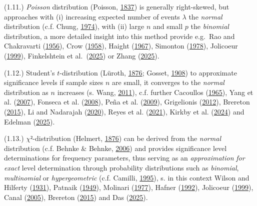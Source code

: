 \documentclass[
]{article}
\begin{document}
(1.11.) \emph{Poisson} distribution (Poisson,
\href{https://gallica.bnf.fr/ark:/12148/bpt6k110193z/f218.image}{1837})
is generally right-skewed, but approaches with (i) increasing expected
number of events \(\lambda\) the \emph{normal} distribution (c.f. Chung,
\href{https://doi.org/10.1007/978-1-4757-3973-2_7}{1974}), with (ii)
large \(n\) and small \(p\) the \emph{binomial} distribution, a more
detailed insight into this method provide e.g.~Rao and Chakravarti
(\href{http://www.jstor.org/stable/3001466}{1956}), Crow
(\href{http://www.jstor.org/stable/2333201}{1958}), Haight
(\href{https://books.google.com/books?id=l8Y-AAAAIAAJ}{1967}), Simonton
(\href{http://www.jstor.org/stable/284821}{1978}), Jolicoeur
(\href{https://doi.org/10.1007/978-1-4615-4777-8_19}{1999}),
Finkelshtein et
al.~(\href{https://doi.org/10.1007/s11009-025-10171-9}{2025}) or Zhang
(\href{https://doi.org/10.54254/2754-1169/2025.BJ24761}{2025}).

(1.12.) Student's \(t\)-distribution (Lüroth,
\href{https://doi.org/10.1002/asna.18760871402}{1876}; Gosset,
\href{https://doi.org/10.2307/2331554}{1908}) to approximate
significance levels if sample sizes \(n\) are small, it converges to the
\emph{normal} distribution as \(n\) increases (s. Wang,
\href{https://doi.org/10.1016/j.spl.2011.03.037}{2011}), c.f. further
Cacoullos (\href{http://www.jstor.org/stable/2282687}{1965}), Yang et
al. (\href{https://doi.org/10.1016/j.jmva.2006.11.003}{2007}), Fonseca
et al. (\href{http://www.jstor.org/stable/20441467}{2008}), Peña et al.
(\href{https://doi.org/10.1007/978-3-540-85636-8_15}{2009}), Grigelionis
(\href{https://doi.org/10.1007/978-3-642-31146-8}{2012}), Brereton
(\href{https://doi.org/10.1002/cem.2734}{2015}), Li and Nadarajah
(\href{https://doi.org/10.1007/s00181-018-1570-0}{2020}), Reyes et al.
(\href{https://doi.org/10.3390/sym13122444}{2021}), Kirkby et al.
(\href{https://doi.org/10.48550/arXiv.1912.01607}{2024}) and Edelman
(\href{https://doi.org/10.48550/arXiv.2508.13226}{2025}).

(1.13.) \(\chi ²\)-distribution (Helmert,
\href{https://gdz.sub.uni-goettingen.de/id/PPN599415665_0021}{1876}) can
be derived from the \emph{normal} distribution (c.f. Behnke \& Behnke,
\href{https://doi.org/10.1007/978-3-531-90003-2_26}{2006}) and provides
significance level determinations for frequency parameters, thus serving
as an \emph{approximation} \emph{for exact} level determination through
probability distributions such as \emph{binomial}, \emph{multinomial} or
\emph{hypergeometric} (c.f. Camilli,
\href{https://doi.org/10.1007/BF02301418}{1995}), s. in this context
Wilson and Hilferty (\href{http://www.jstor.org/stable/86022}{1931}),
Patnaik (\href{http://www.jstor.org/stable/2332542}{1949}), Molinari
(\href{http://www.jstor.org/stable/2335780}{1977}), Hafner
(\href{https://doi.org/10.1007/978-3-7091-3420-7_14}{1992}), Jolicoeur
(\href{https://doi.org/10.1007/978-1-4615-4777-8_8}{1999}), Canal
(\href{https://doi.org/10.1016/j.csda.2004.04.001}{2005}), Brereton
(\href{https://doi.org/10.1002/cem.2734}{2015}) and Das
(\href{https://arxiv.org/abs/2404.05062}{2025}).
\end{document}
